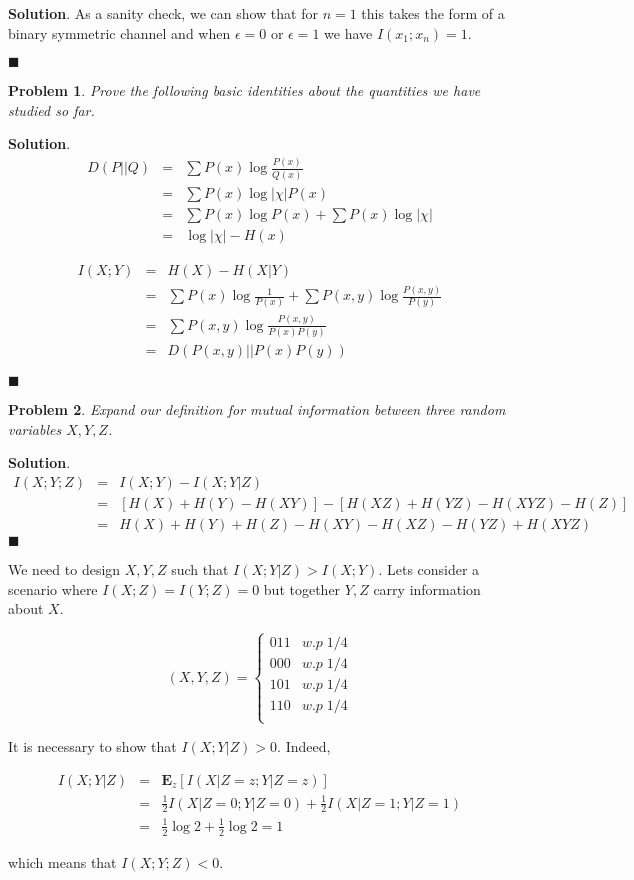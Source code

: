 \documentclass[12pt]{article}
\newtheorem{p}{Problem}[section]
\theoremstyle{definition}
\newenvironment{s}{%
        \begin{trivlist} \item \textbf{Solution}. }{%
            \hspace*{\fill} $\blacksquare$\end{trivlist}}%
\begin{document}
{\begin{s}
As a sanity check, we can show that for $n=1$ this takes the form of a binary symmetric channel and when $\epsilon = 0$ or $\epsilon = 1$ we have $I(x_{1};x_{n})=1$.


\end{s}

\begin{p}
Prove the following basic identities about the quantities we have studied so far.
\end{p}

\begin{s}
\begin{eqnarray}
D(P||Q) &=& \sum P(x)\log \frac{P(x)}{Q(x)}\\
&=& \sum P(x)\log |\chi | P(x)\\
&=& \sum P(x) \log P(x) + \sum P(x)\log |\chi |\\
&=& \log |\chi| - H(x)
\end{eqnarray}

\begin{eqnarray}
I(X;Y) &=& H(X) - H(X|Y)\\
&=& \sum P(x)\log \frac{1}{P(x)} + \sum P(x,y)\log \frac{P(x,y)}{P(y)} \\
&=& \sum P(x,y) \log \frac{P(x,y)}{P(x)P(y)}\\
&=& D(P(x,y)||P(x)P(y))
\end{eqnarray}


\end{s}

\begin{p}
Expand our definition for mutual information between three random variables $X,Y,Z$.
\end{p}

\begin{s}
\begin{eqnarray*}
I(X;Y;Z) &=& I(X;Y) - I(X;Y|Z)\\
&=& [H(X) + H(Y) - H(XY)]- [H(XZ)+H(YZ)-H(XYZ)-H(Z)] \\
&=& H(X) + H(Y) + H(Z) - H(XY) - H(XZ) - H(YZ) + H(XYZ)
\end{eqnarray*}
\end{s}

We need to design $X,Y,Z$ such that $I(X;Y|Z) > I(X;Y)$. Lets consider a scenario where $I(X;Z) = I(Y;Z)=0$ but together $Y,Z$ carry information about $X$.

\[(X,Y,Z)= \begin{cases} 
      011 & w.p \; 1/4 \\
      000 & w.p \; 1/4 \\
      101 & w.p \; 1/4 \\
      110 & w.p \; 1/4 \\
   \end{cases}
\]

It is necessary to show that $I(X;Y|Z) > 0$. Indeed,

\begin{eqnarray*}
I(X;Y|Z) &=& \mathbf{E}_{z}[I(X|Z=z; Y|Z=z)]\\
&=& \frac{1}{2}I(X|Z=0; Y|Z=0) + \frac{1}{2}I(X|Z=1; Y|Z=1)\\
&=& \frac{1}{2}\log 2 + \frac{1}{2} \log 2 = 1
\end{eqnarray*}

which means that $I(X;Y;Z) < 0$.
\end{document}
